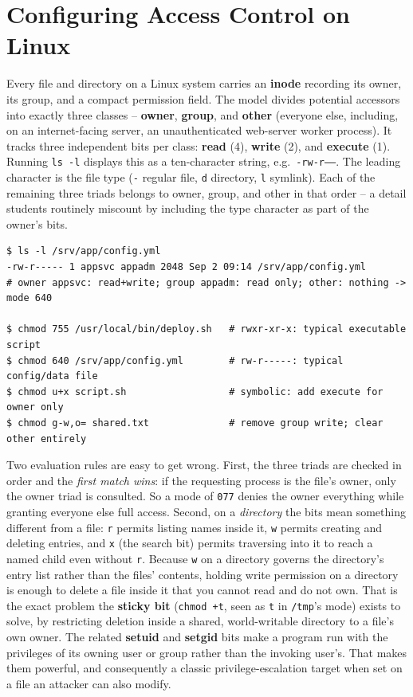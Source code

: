 \section{Configuring Access Control on Linux}

Every file and directory on a Linux system carries an \textbf{inode} recording its owner, its
group, and a compact permission field. The model divides potential accessors into exactly three
classes -- \textbf{owner}, \textbf{group}, and \textbf{other} (everyone else, including, on an
internet-facing server, an unauthenticated web-server worker process). It tracks three
independent bits per class: \textbf{read} (4), \textbf{write} (2), and \textbf{execute} (1). Running
\texttt{ls -l} displays this as a ten-character string, e.g.\ \texttt{-rw-r-----}. The leading
character is the file type (\texttt{-} regular file, \texttt{d} directory, \texttt{l} symlink). Each
of the remaining three triads belongs to owner, group, and other in that order -- a detail
students routinely miscount by including the type character as part of the owner's bits.

\begin{lstlisting}[caption={Reading and setting Linux permissions}]
$ ls -l /srv/app/config.yml
-rw-r----- 1 appsvc appadm 2048 Sep 2 09:14 /srv/app/config.yml
# owner appsvc: read+write; group appadm: read only; other: nothing -> mode 640

$ chmod 755 /usr/local/bin/deploy.sh   # rwxr-xr-x: typical executable script
$ chmod 640 /srv/app/config.yml        # rw-r-----: typical config/data file
$ chmod u+x script.sh                  # symbolic: add execute for owner only
$ chmod g-w,o= shared.txt              # remove group write; clear other entirely
\end{lstlisting}

Two evaluation rules are easy to get wrong. First, the three triads are checked in order and the
\emph{first match wins}: if the requesting process is the file's owner, only the owner triad is
consulted. So a mode of \texttt{077} denies the owner everything while granting everyone else full
access. Second, on a \emph{directory} the bits mean something different from a file: \texttt{r}
permits listing names inside it, \texttt{w} permits creating and deleting entries, and \texttt{x}
(the search bit) permits traversing into it to reach a named child even without \texttt{r}.
Because \texttt{w} on a directory governs the directory's entry list rather than the files' contents,
holding write permission on a directory is enough to delete a file inside it that you cannot read
and do not own. That is the exact problem the \textbf{sticky bit} (\texttt{chmod +t}, seen as \texttt{t}
in \texttt{/tmp}'s mode) exists to solve, by restricting deletion inside a shared, world-writable
directory to a file's own owner. The related \textbf{setuid} and \textbf{setgid} bits make a
program run with the privileges of its owning user or group rather than the invoking user's. That
makes them powerful, and consequently a classic privilege-escalation target when set on a file an
attacker can also modify.

